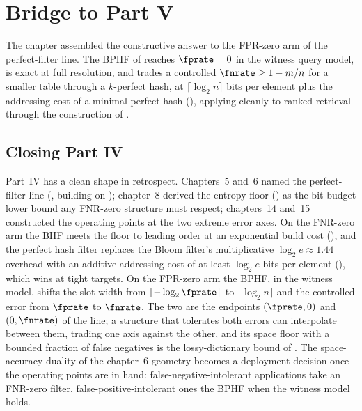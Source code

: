 %

\section{Bridge to Part V}
\label{sec:bridge-to-part5}

The chapter assembled the constructive answer to the FPR-zero arm of the
perfect-filter line. The BPHF of  reaches $\fprate = 0$ in
the witness query model, is exact at full resolution, and trades a
controlled $\fnrate \ge 1 - m/n$ for a smaller table through a
$k$-perfect hash, at $\lceil \log_2 n \rceil$ bits per element plus the
addressing cost of a minimal perfect hash (),
applying cleanly to ranked retrieval through the construction of
.

\subsection*{Closing Part IV}

Part~IV has a clean shape in retrospect. Chapters~5 and~6 named the
perfect-filter line (, building on
); chapter~8 derived the entropy floor
() as the bit-budget lower bound any FNR-zero
structure must respect; chapters~14 and~15 constructed the operating
points at the two extreme error axes. On the FNR-zero arm the BHF meets
the floor to leading order at an exponential build cost
(), and the perfect hash filter replaces the
Bloom filter's multiplicative $\log_2 e \approx 1.44$ overhead with an
additive addressing cost of at least $\log_2 e$ bits per element
(), which wins at tight targets. On the FPR-zero
arm the BPHF, in the witness model, shifts the slot width from $\lceil
-\log_2 \fprate \rceil$ to $\lceil \log_2 n \rceil$ and the controlled
error from $\fprate$ to $\fnrate$. The two are the endpoints $(\fprate, 0)$ and
$(0, \fnrate)$ of the line; a structure that tolerates both errors can
interpolate between them, trading one axis against the other, and its
space floor with a bounded fraction of false negatives is the
lossy-dictionary bound of \textcite[Prop.~1]{pagh-rodler-2001}. The space-accuracy duality of the chapter~6 geometry becomes
a deployment decision once the operating points are in hand:
false-negative-intolerant applications take an FNR-zero filter,
false-positive-intolerant ones the BPHF when the witness model holds.

